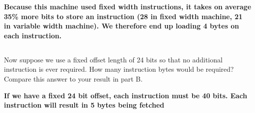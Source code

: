 \documentclass{article}
\begin{document}
\textbf{Because this machine used fixed width instructions, it takes on average 35\% more bits to store an instruction (28 in fixed width machine, 21 in variable width machine). We therefore end up loading 4 bytes on each instruction.}
\subsection{} 
Now suppose we use a fixed offset length of 24 bits so that no additional instruction is ever required. How many instruction bytes would be required? Compare this answer to your result in part B.
\vspace{5mm}

\textbf{If we have a fixed 24 bit offset, each instruction must be 40 bits. Each instruction will result in 5 bytes being fetched}
\end{document}
